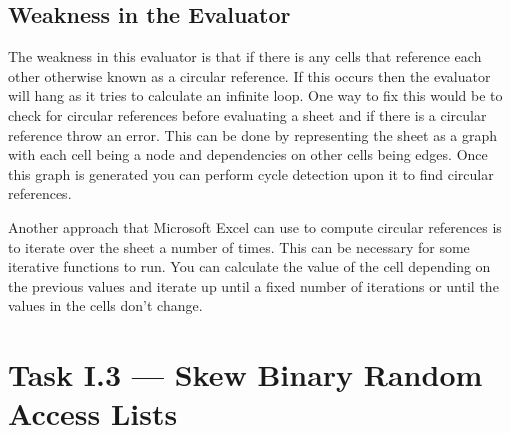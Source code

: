 \documentclass[a4paper]{article}
\begin{document}
\subsection{Weakness in the Evaluator}
The weakness in this evaluator is that if there is any cells that reference each other otherwise known as a circular reference.
If this occurs then the evaluator will hang as it tries to calculate an infinite loop.
One way to fix this would be to check for circular references before evaluating a sheet and if there is a circular reference throw an error.
This can be done by representing the sheet as a graph with each cell being a node and dependencies on other cells being edges.
Once this graph is generated you can perform cycle detection upon it to find circular references.
\par
Another approach that Microsoft Excel can use to compute circular references is to iterate over the sheet a number of times.
This can be necessary for some iterative functions to run.
You can calculate the value of the cell depending on the previous values and iterate up until a fixed number of iterations or until the values in the cells don't change.

\section{Task I.3 --- Skew Binary Random Access Lists}
\end{document}
